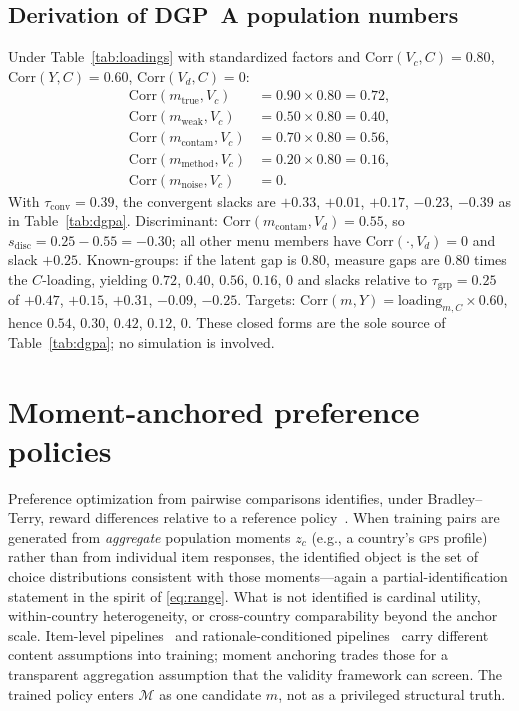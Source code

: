 \documentclass[10pt,letterpaper]{article}
\newcommand{\GPS}{\textsc{gps}}
\newcommand{\M}{\ensuremath{\mathcal{M}}}
\begin{document}
\subsection{Derivation of DGP~A population numbers}
Under Table~\ref{tab:loadings} with standardized factors and $\mathrm{Corr}(V_{\!c},C)=0.80$, $\mathrm{Corr}(Y,C)=0.60$, $\mathrm{Corr}(V_{\!d},C)=0$:
\begin{align*}
\mathrm{Corr}(m_{\mathrm{true}},V_{\!c})&=0.90\times 0.80=0.72,\\
\mathrm{Corr}(m_{\mathrm{weak}},V_{\!c})&=0.50\times 0.80=0.40,\\
\mathrm{Corr}(m_{\mathrm{contam}},V_{\!c})&=0.70\times 0.80=0.56,\\
\mathrm{Corr}(m_{\mathrm{method}},V_{\!c})&=0.20\times 0.80=0.16,\\
\mathrm{Corr}(m_{\mathrm{noise}},V_{\!c})&=0.
\end{align*}
With $\tau_{\mathrm{conv}}=0.39$, the convergent slacks are
$+0.33$, $+0.01$, $+0.17$, $-0.23$, $-0.39$ as in Table~\ref{tab:dgpa}.
Discriminant: $\mathrm{Corr}(m_{\mathrm{contam}},V_{\!d})=0.55$, so
$s_{\mathrm{disc}}=0.25-0.55=-0.30$; all other menu members have $\mathrm{Corr}(\cdot,V_{\!d})=0$ and slack $+0.25$.
Known-groups: if the latent gap is $0.80$, measure gaps are $0.80$ times the $C$-loading, yielding
$0.72$, $0.40$, $0.56$, $0.16$, $0$ and slacks relative to $\tau_{\mathrm{grp}}=0.25$ of
$+0.47$, $+0.15$, $+0.31$, $-0.09$, $-0.25$.
Targets: $\mathrm{Corr}(m,Y)=\mathrm{loading}_{m,C}\times 0.60$, hence
$0.54$, $0.30$, $0.42$, $0.12$, $0$.
These closed forms are the sole source of Table~\ref{tab:dgpa}; no simulation is involved.

\section{Moment-anchored preference policies}
\label{app:moment}
Preference optimization from pairwise comparisons identifies, under Bradley--Terry, reward differences relative to a reference policy~\cite{bradley1952,rafailov2023}.
When training pairs are generated from \emph{aggregate} population moments $z_c$ (e.g., a country's \GPS{} profile) rather than from individual item responses, the identified object is the set of choice distributions consistent with those moments---again a partial-identification statement in the spirit of \eqref{eq:range}.
What is not identified is cardinal utility, within-country heterogeneity, or cross-country comparability beyond the anchor scale.
Item-level pipelines~\cite{plural2026} and rationale-conditioned pipelines~\cite{palms2026} carry different content assumptions into training; moment anchoring trades those for a transparent aggregation assumption that the validity framework can screen.
The trained policy enters $\M$ as one candidate $m$, not as a privileged structural truth.
\end{document}
